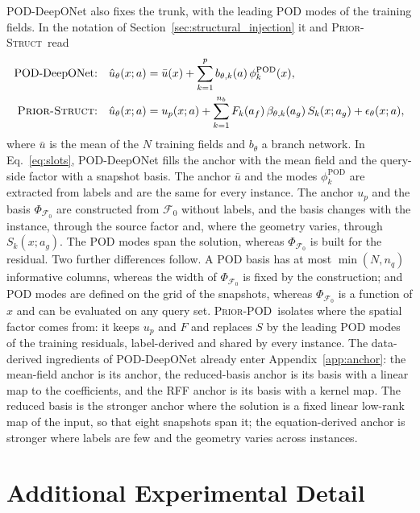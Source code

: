\documentclass{article}
\newcommand{\armstruct}{\textsc{Prior-Struct}}
\newcommand{\armpod}{\textsc{Prior-POD}}
\begin{document}
POD-DeepONet \citep{lu2022} also fixes the trunk, with the leading POD modes of the
training fields. In the notation of Section~\ref{sec:structural_injection} it and
\armstruct\ read
\begin{equation}
\begin{aligned}
\text{POD-DeepONet:}\quad
&\hat u_\theta(x;a)=\bar u(x)+\sum_{k=1}^{p} b_{\theta,k}(a)\,\phi_k^{\mathrm{POD}}(x),\\
\text{\armstruct:}\quad
&\hat u_\theta(x;a)=u_p(x;a)+\sum_{k=1}^{n_b} F_k(a_f)\,\beta_{\theta,k}(a_g)\,S_k(x;a_g)+\epsilon_\theta(x;a),
\end{aligned}
\label{eq:pod-contrast}
\end{equation}
where $\bar u$ is the mean of the $N$ training fields and $b_\theta$ a branch network. In
Eq.~\ref{eq:slots}, POD-DeepONet fills the anchor with the mean field and the query-side
factor with a snapshot basis. The anchor $\bar u$ and the modes $\phi_k^{\mathrm{POD}}$ are
extracted from labels and are the same for every instance. The anchor $u_p$ and the basis
$\Phi_{\mathcal{F}_0}$ are constructed from $\mathcal{F}_0$ without labels, and the basis
changes with the instance, through the source factor and, where the geometry varies, through
$S_k(x;a_g)$. The POD modes span the solution, whereas $\Phi_{\mathcal{F}_0}$ is built for
the residual. Two further differences follow. A POD basis has at most $\min(N,n_q)$
informative columns, whereas the width of $\Phi_{\mathcal{F}_0}$ is fixed by the
construction; and POD modes are defined on the grid of the snapshots, whereas
$\Phi_{\mathcal{F}_0}$ is a function of $x$ and can be evaluated on any query set. \armpod\
isolates where the spatial factor comes from: it keeps $u_p$ and $F$ and replaces $S$ by the
leading POD modes of the training residuals, label-derived and shared by every instance. The data-derived ingredients of POD-DeepONet already enter
Appendix~\ref{app:anchor}: the mean-field anchor is its anchor, the reduced-basis anchor
is its basis with a linear map to the coefficients, and the RFF anchor is its basis with
a kernel map. The reduced basis is the stronger anchor where the solution is a fixed
linear low-rank map of the input, so that eight snapshots span it; the equation-derived
anchor is stronger where labels are few and the geometry varies across instances.

\section{Additional Experimental Detail}
\label{app:details}
\end{document}
